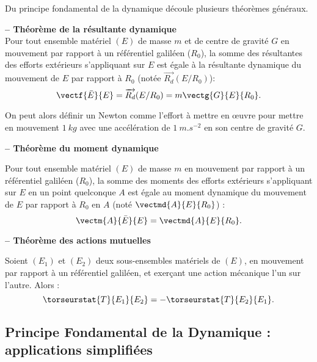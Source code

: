 Du principe fondamental de la dynamique découle plusieurs théorèmes généraux.

\begin{theorem}\textbf{\textsf{\small -- Théorème de la résultante dynamique}}\\
			Pour tout ensemble matériel $(E)$ de masse $m$ et de centre de gravité $G$ en mouvement par rapport à un référentiel galiléen ($R_0$), la somme des résultantes des efforts extérieurs s'appliquant sur $E$ est égale à la résultante dynamique du mouvement de $E$ par rapport à $R_0$ (notée $\overrightarrow{R_d}(E/R_0)$): 
$$\vectf{\bar E}{E}=\overrightarrow{R_d}(E/R_0)=m\vectg{G}{E}{R_0}.$$
\end{theorem}

\begin{rem}
On peut alors définir un Newton comme l'effort à mettre en \oe{}uvre pour mettre en mouvement $\SI{1}{kg}$ avec une accélération de $\SI{1}{m.s^{-2}}$ en son centre de gravité $G$.
\end{rem}
\begin{theorem}\textbf{\textsf{\small -- Théorème du moment dynamique}} 

			Pour tout ensemble matériel $(E)$ de masse $m$ en mouvement par rapport à un référentiel galiléen ($R_0$), la somme des moments des efforts extérieurs s'appliquant sur $E$ en un point quelconque $A$ est égale au moment dynamique du mouvement de $E$ par rapport à $R_0$ en $A$ (noté $\vectmd{A}{E}{R_0}$) : 
$$\vectm{A}{\bar E}{E}=\vectmd{A}{E}{R_0}.$$
\end{theorem}

\begin{theorem}\textbf{\textsf{\small -- Théorème des actions mutuelles}}

Soient $(E_1)$ et $(E_2)$ deux sous-ensembles matériels de $(E)$,
en mouvement par rapport à un référentiel galiléen, et exerçant une action mécanique l'un sur l'autre. Alors :
	$$\torseurstat{T}{E_1}{E_2}=-\torseurstat{T}{E_2}{E_1}.$$
\end{theorem}
		


\subsection[PFD : applications simplifiées]{Principe Fondamental de la Dynamique : applications simplifiées}

